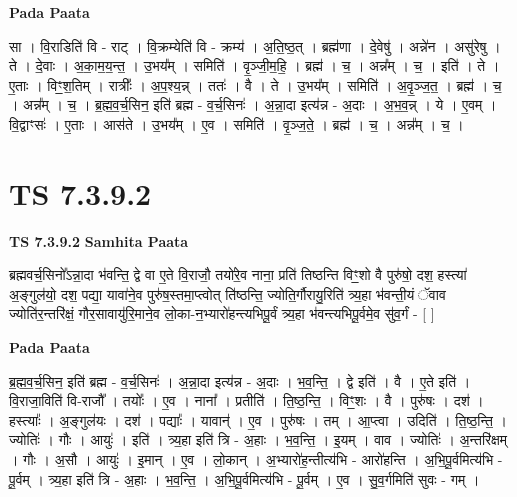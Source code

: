\documentclass[17pt]{extarticle}
\begin{document}
\textbf{Pada Paata} \newline

सा । वि॒राडिति॑ वि - राट् । वि॒क्रम्येति॑ वि - क्रम्य॑ । अ॒ति॒ष्ठ॒त् । ब्रह्म॑णा । दे॒वेषु॑ । अन्ने॑न । असु॑रेषु । ते । दे॒वाः । अ॒का॒म॒य॒न्त॒ । उ॒भय᳚म् । समिति॑ । वृ॒ञ्जी॒म॒हि॒ । ब्रह्म॑ । च॒ । अन्न᳚म् । च॒ । इति॑ । ते । ए॒ताः । विꣳ॒॒श॒तिम् । रात्रीः᳚ । अ॒प॒श्य॒न्न् । ततः॑ । वै । ते । उ॒भय᳚म् । समिति॑ । अ॒वृ॒ञ्ज॒त॒ । ब्रह्म॑ । च॒ । अन्न᳚म् । च॒ । ब्र॒ह्म॒व॒र्च॒सिन॒ इति॑ ब्रह्म - व॒र्च॒सिनः॑ । अ॒न्ना॒दा इत्य॑न्न - अ॒दाः । अ॒भ॒व॒न्न् । ये । ए॒वम् । वि॒द्वाꣳसः॑ । ए॒ताः । आस॑ते । उ॒भय᳚म् । ए॒व । समिति॑ । वृ॒ञ्ज॒ते॒ । ब्रह्म॑ । च॒ । अन्न᳚म् । च॒ ।  \newline





\section{ TS 7.3.9.2 }

\textbf{TS 7.3.9.2 } \newline
\textbf{Samhita Paata} \newline

ब्रह्मवर्च॒सिनो᳚ऽन्ना॒दा भ॑वन्ति॒ द्वे वा ए॒ते वि॒राजौ॒ तयो॑रे॒व नाना॒ प्रति॑ तिष्ठन्ति विꣳ॒॒शो वै पुरु॑षो॒ दश॒ हस्त्या॑ अ॒ङ्गुल॑यो॒ दश॒ पद्या॒ यावा॑ने॒व पुरु॑ष॒स्तमा॒प्त्वोत् ति॑ष्ठन्ति॒ ज्योति॒र्गौरायु॒रिति॑ त्र्य॒हा भ॑वन्ती॒यं ॅवाव ज्योति॑र॒न्तरि॑क्षं॒ गौर॒सावायु॑रि॒माने॒व लो॒का-न॒भ्यारो॑हन्त्यभिपू॒र्वं त्र्य॒हा भ॑वन्त्यभिपू॒र्वमे॒व सु॑व॒र्गं - [  ] \newline

\textbf{Pada Paata} \newline

ब्र॒ह्म॒व॒र्च॒सिन॒ इति॑ ब्रह्म - व॒र्च॒सिनः॑ । अ॒न्ना॒दा इत्य॑न्न - अ॒दाः । भ॒व॒न्ति॒ । द्वे इति॑ । वै । ए॒ते इति॑ । वि॒राजा॒विति॑ वि-राजौ᳚ । तयोः᳚ । ए॒व । नाना᳚ । प्रतीति॑ । ति॒ष्ठ॒न्ति॒ । विꣳ॒॒शः । वै । पुरु॑षः । दश॑ । हस्त्याः᳚ । अ॒ङ्गुल॑यः । दश॑ । पद्याः᳚ । यावान्॑ । ए॒व । पुरु॑षः । तम् । आ॒प्त्वा । उदिति॑ । ति॒ष्ठ॒न्ति॒ । ज्योतिः॑ । गौः । आयुः॑ । इति॑ । त्र्य॒हा इति॑ त्रि - अ॒हाः । भ॒व॒न्ति॒ । इ॒यम् । वाव । ज्योतिः॑ । अ॒न्तरि॑क्षम् । गौः । अ॒सौ । आयुः॑ । इ॒मान् । ए॒व । लो॒कान् । अ॒भ्यारो॑ह॒न्तीत्य॑भि - आरो॑हन्ति । अ॒भि॒पू॒र्वमित्य॑भि - पू॒र्वम् । त्र्य॒हा इति॑ त्रि - अ॒हाः । भ॒व॒न्ति॒ । अ॒भि॒पू॒र्वमित्य॑भि - पू॒र्वम् । ए॒व । सु॒व॒र्गमिति॑ सुवः - गम् ।  \newline
\end{document}
